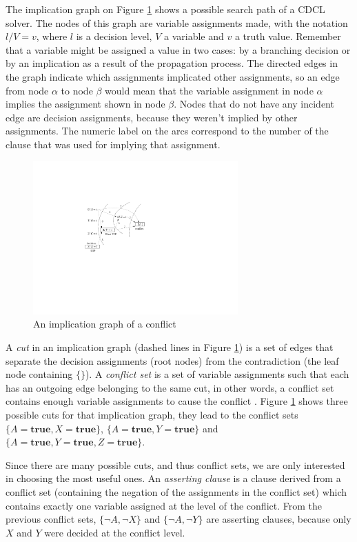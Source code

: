 \documentclass[12pt]{diicc}
\begin{document}
The implication graph on Figure \ref{fig:uip} shows a possible search path of a CDCL solver. The nodes of this graph are variable assignments made, with the notation $l/V=v$, where $l$ is a decision level, $V$ a variable and $v$ a truth value. Remember that a variable might be assigned a value in two cases: by a branching decision or by an implication as a result of the propagation process. The directed edges in the graph indicate which assignments implicated other assignments, so an edge from node $\alpha$ to node $\beta$ would mean that the variable assignment in node $\alpha$ implies the assignment shown in node $\beta$. Nodes that do not have any incident edge are decision assignments, because they weren't implied by other assignments. The numeric label on the arcs correspond to the number of the clause that was used for implying that assignment. 

\begin{figure}[h!]
	\centering
		\includegraphics[width=0.7\textwidth]{uip}
	\caption{An implication graph of a conflict}
	\label{fig:uip}
\end{figure}

A \textit{cut} in an implication graph (dashed lines in Figure \ref{fig:uip}) is a set of edges that separate the decision assignments (root nodes) from the contradiction (the leaf node containing $\{\}$). A \textit{conflict set} is a set of variable assignments such that each has an outgoing edge belonging to the same cut, in other words, a conflict set contains enough variable assignments to cause the conflict \cite{grasp,cdcl1,ig}. Figure \ref{fig:uip} shows three possible cuts for that implication graph, they lead to the conflict sets $\{A=\textbf{true},X=\textbf{true}\}$, $\{A=\textbf{true},Y=\textbf{true}\}$ and $\{A=\textbf{true},Y=\textbf{true},Z=\textbf{true}\}$.

Since there are many possible cuts, and thus conflict sets, we are only interested in choosing the most useful ones. An \textit{asserting clause} \cite{cdcl1} is a clause derived from a conflict set (containing the negation of the assignments in the conflict set) which contains exactly one variable assigned at the level of the conflict. From the previous conflict sets, $\{\neg A,\neg X\}$ and $\{\neg A,\neg Y\}$ are asserting clauses, because only $X$ and $Y$ were decided at the conflict level. 
\end{document}
